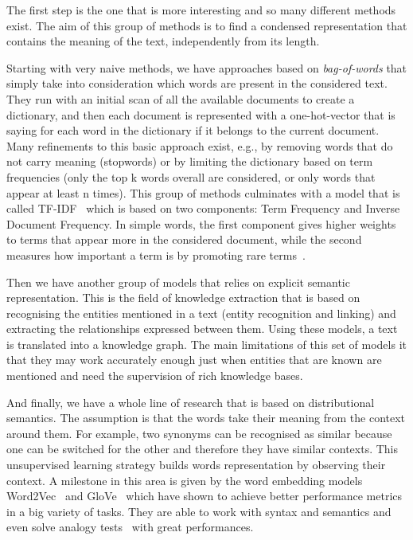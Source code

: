 The first step is the one that is more interesting and so many different methods exist.
The aim of this group of methods is to find a condensed representation that contains the meaning of the text, independently from its length.

Starting with very naive methods, we have approaches based on \emph{bag-of-words} that simply take into consideration which words are present in the considered text.
They run with an initial scan of all the available documents to create a dictionary, and then each document is represented with a one-hot-vector that is saying for each word in the dictionary if it belongs to the current document.
Many refinements to this basic approach exist, e.g., by removing words that do not carry meaning (stopwords) or by limiting the dictionary based on term frequencies (only the top k words overall are considered, or only words that appear at least n times).
This group of methods culminates with a model that is called TF-IDF~\cite{jones1972statistical} which is based on two components: Term Frequency and Inverse Document Frequency.
In simple words, the first component gives higher weights to terms that appear more in the considered document, while the second measures how important a term is by promoting rare terms~\cite{jones1972statistical}.

Then we have another group of models that relies on explicit semantic representation. This is the field of knowledge extraction that is based on recognising the entities mentioned in a text (entity recognition and linking) and extracting the relationships expressed between them. Using these models, a text is translated into a knowledge graph.
The main limitations of this set of models it that they may work accurately enough just when entities that are known are mentioned and need the supervision of rich knowledge bases.

And finally, we have a whole line of research that is based on distributional semantics.
The assumption is that the words take their meaning from the context around them. For example, two synonyms can be recognised as similar because one can be switched for the other and therefore they have similar contexts.
This unsupervised learning strategy builds words representation by observing their context.
A milestone in this area is given by the word embedding models Word2Vec~\cite{mikolov2013efficient} and GloVe~\cite{pennington2014glove} which have shown %
to achieve better performance metrics in a big variety of tasks.
They are able to work with syntax and semantics and even solve analogy tests~\cite{mikolov2013efficient} with great performances.


